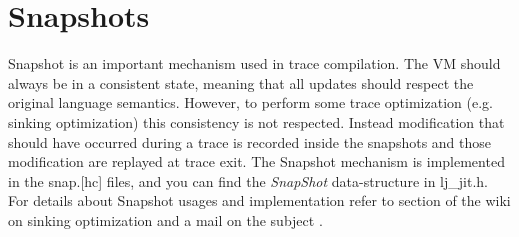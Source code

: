 
\section{Snapshots}
\label{Sec:ir-snap}

Snapshot is an important mechanism used in trace compilation. The VM should
always be in a consistent state, meaning that all updates should respect the
original language semantics. However, to perform some trace optimization
(e.g. sinking optimization) this consistency is not respected. Instead
modification that should have occurred during a trace is recorded inside the
snapshots and those modification are replayed at trace exit. The Snapshot
mechanism is implemented in the snap.[hc] files, and you can find the
\emph{SnapShot} data-structure in lj\_jit.h. For details about
Snapshot usages and implementation refer to section of the wiki on sinking
optimization \cite{luajit-sink} and a mail on the subject \cite{luajit-mail-1}.
